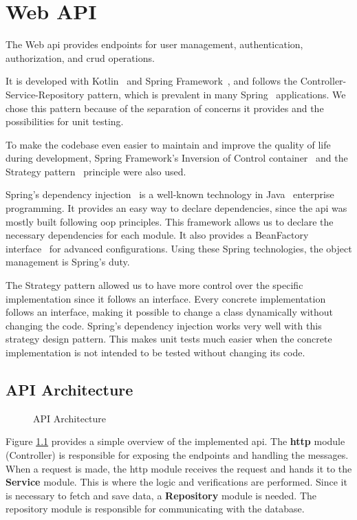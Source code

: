 \chapter{Web API} \label{cap:web_api}
The Web \ac{api} provides endpoints for user management, authentication, authorization, and \ac{crud} operations. 

It is developed with Kotlin~\cite{kotlin} and Spring Framework~\cite{spring-framework}, and follows the Controller-Service-Repository pattern, which is prevalent in many Spring~\cite{spring} applications. We chose this pattern because of the separation of concerns it provides and the possibilities for unit testing.

To make the codebase even easier to maintain and improve the quality of life during development, Spring Framework's Inversion of Control container~\cite{spring-ioc-container} and the Strategy pattern~\cite{strategy-pattern} principle were also used. 

Spring's dependency injection~\cite{spring-di} is a well-known technology in Java~\cite{java} enterprise programming. It provides an easy way to declare dependencies, since the \ac{api} was mostly built following \ac{oop} principles. This framework allows us to declare the necessary dependencies for each module. It also provides a BeanFactory interface~\cite{spring-bean-factory} for advanced configurations. Using these Spring technologies, the object management is Spring's duty.

The Strategy pattern allowed us to have more control over the specific implementation since it follows an interface. Every concrete implementation follows an interface, making it possible to change a class dynamically without changing the code. Spring's dependency injection works very well with this strategy design pattern. This makes unit tests much easier when the concrete implementation is not intended to be tested without changing its code.

\section{API Architecture}

\begin{figure}[H]
    \centering
    
    \caption{API Architecture}
    \label{fig:api_architecture}
\end{figure}

Figure \ref{fig:api_architecture} provides a simple overview of the implemented \acs{api}. The \textbf{\ac{http}} module (Controller) is responsible for exposing the endpoints and handling the messages. When a request is made, the \acs{http} module receives the request and hands it to the \textbf{Service} module. This is where the logic and verifications are performed. Since it is necessary to fetch and save data, a \textbf{Repository} module is needed. The repository module is responsible for communicating with the database.

